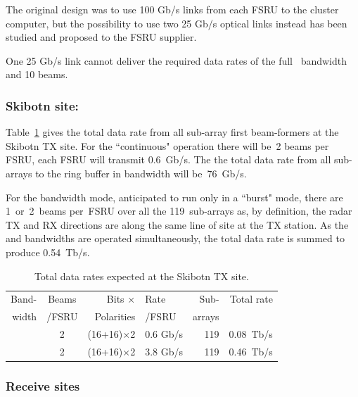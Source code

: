 \documentclass[12pt,a4paper]{article}
\begin{document}
The original design was to use 100 Gb/s links from each FSRU to the cluster computer, but the possibility to use two 25 Gb/s optical links instead has been studied and proposed to the FSRU supplier.  

One 25 Gb/s link cannot deliver the required data rates of the full \WBW\ bandwidth and 10 beams.  


\subsubsection{Skibotn site:}
\label{sssec:rates:skib}

Table~\ref{tab:skib:rates} gives the total data rate from all sub-array first beam-formers at the Skibotn TX site.
For the \NBW{} ``continuous" operation there will be~2 beams per FSRU, 
each FSRU will transmit 0.6~Gb/s.
The the total data rate from all sub-arrays to the ring buffer in \NBW{} bandwidth will be~76~Gb/s.

For the \WBW{} bandwidth mode, anticipated to run only in a ``burst" mode, there are 1~or~2~beams per~FSRU over all the 119~sub-arrays as, by definition, the radar TX and RX directions are along the same line of site at the TX station.
As the \NBW{} and \WBW{} bandwidths are operated simultaneously, the  total data rate is summed to produce 0.54~Tb/s.
\begin{table}[h]
\centering
\begin{tabular}{rcrlr|r}
{Band-} & {Beams} & {Bits $\times$}    & Rate    & Sub- & {Total rate} \\
{width} & {/FSRU} & {Polarities} & {/FSRU} & arrays & \\ \hline
\NBW{} & 2 & (16+16)$\times$2 & 0.6 Gb/s & 119 & 0.08~Tb/s \\
\WBW{} & 2 & (16+16)$\times$2 & 3.8 Gb/s & 119 & 0.46~Tb/s \\
\end{tabular}
\caption{Total data rates expected at the Skibotn TX site. \label{tab:skib:rates}}
\end{table}

\subsubsection{Receive sites}
\label{sssec:rates:rx}
\end{document}
